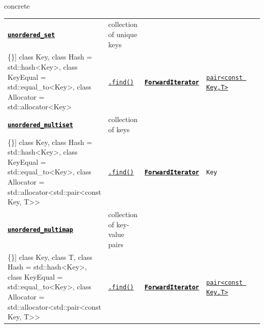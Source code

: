 \documentclass{beamer}
\newcommand\ccode[1]{\textcolor{black}{\texttt{\textbf{#1}}}}
\newcommand\hcode[1]{\textcolor{black}{\texttt{\textbf{#1}}}}
\newcommand\codel[1]{\texttt{#1}}
\begin{document}
\begin{textblock}{65.2}
\begin{beamercolorbox}[sep=2mm,wd=65.2cm,rounded=true]{concrete}
\begin{tabular*}{\linewidth}{l  l  l  l  l  l}
      \href{http://en.cppreference.com/w/cpp/container/unordered_set}{\hcode{unordered\_set}} & collection of unique keys
      & \begin{minipage}{8.7in}
          \linespread{0.5}
\begin{Verbatim}[commandchars=\\\{\}]
class Key, class Hash = std::hash<Key>, class KeyEqual = std::equal\_to<Key>,
class Allocator = std::allocator<Key>
\end{Verbatim}
          \end{minipage} & \href{http://en.cppreference.com/w/cpp/container/unordered_map/find}{\codel{.find()}} & \href{http://en.cppreference.com/w/cpp/concept/ForwardIterator}{\ccode{ForwardIterator}} & \href{http://en.cppreference.com/w/cpp/utility/pair}{\codel{pair<const Key,T>}} \\
      \rowcolor{white}
      \href{http://en.cppreference.com/w/cpp/container/unordered_multiset}{\hcode{unordered\_multiset}} & collection of keys
      & \begin{minipage}{7in}
          \linespread{0.5}
          \begin{Verbatim}[commandchars=\\\{\}]
class Key, class Hash = std::hash<Key>, class KeyEqual = std::equal_to<Key>,
class Allocator = std::allocator<std::pair<const Key, T>>
          \end{Verbatim}
        \end{minipage} & \href{http://en.cppreference.com/w/cpp/container/unordered_multiset/find}{\codel{.find()}} & \href{http://en.cppreference.com/w/cpp/concept/ForwardIterator}{\ccode{ForwardIterator}} & \codel{Key} \\
      \href{http://en.cppreference.com/w/cpp/container/unordered_multimap}{\hcode{unordered\_multimap}} & collection of key-value pairs
      & \begin{minipage}{7in}
          \linespread{0.5}
          \begin{Verbatim}[commandchars=\\\{\}]
class Key, class T, class Hash = std::hash<Key>,
class KeyEqual = std::equal_to<Key>,
class Allocator = std::allocator<std::pair<const Key, T>>
          \end{Verbatim}
          \end{minipage} & \href{http://en.cppreference.com/w/cpp/container/unordered_multimap/find}{\codel{.find()}} & \href{http://en.cppreference.com/w/cpp/concept/ForwardIterator}{\ccode{ForwardIterator}} & \href{http://en.cppreference.com/w/cpp/utility/pair}{\codel{pair<const Key,T>}} \\
    \end{tabular*}
  \end{beamercolorbox}
\end{textblock}
\end{document}

